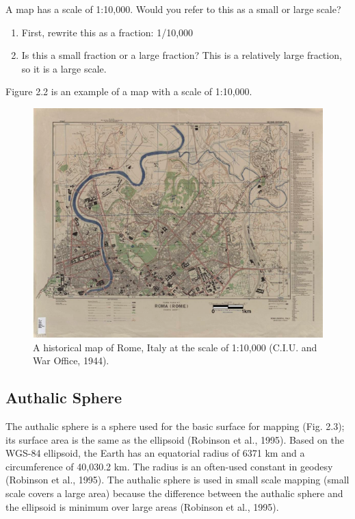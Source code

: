 \documentclass[a4paper , 12pt]{book}
\begin{document}
A map has a scale of 1:10,000. Would you refer to this as a small or large scale?

\begin{enumerate}
    \item First, rewrite this as a fraction: 1/10,000
    \item Is this a small fraction or a large fraction? This is a relatively large fraction, so it is a large scale. 
\end{enumerate}

Figure 2.2 is an example of a map with a scale of 1:10,000.

\begin{figure}[ht]
    \centering
    \includegraphics[width=12cm]{ch2f2.pdf}
    \caption{A historical map of Rome, Italy at the scale of 1:10,000 (C.I.U. and War Office, 1944).}
\end{figure}

\subsection{Authalic Sphere}

The authalic sphere is a sphere used for the basic surface for mapping (Fig. 2.3); its surface area is the same as the ellipsoid (Robinson et al., 1995). Based on the WGS-84 ellipsoid, the Earth has an equatorial radius of 6371 km and a circumference of 40,030.2 km. The radius is an often-used constant in geodesy (Robinson et al., 1995). The authalic sphere is used in small scale mapping (small scale covers a large area) because the difference between the authalic sphere and the ellipsoid is minimum over large areas (Robinson et al., 1995).
\end{document}
